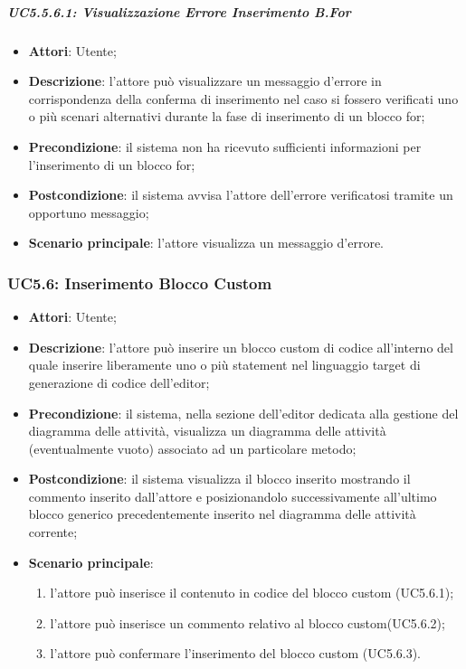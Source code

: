 \subparagraph{UC5.5.6.1: Visualizzazione Errore Inserimento B.For}
\label{UC5.5.6.1}
\begin{itemize}
\item \textbf{Attori}: Utente;
\item \textbf{Descrizione}: l'attore può visualizzare un messaggio d'errore in corrispondenza della conferma di inserimento nel caso si fossero verificati uno o più scenari alternativi durante la fase di inserimento di un blocco for;	
\item \textbf{Precondizione}: il sistema non ha ricevuto sufficienti informazioni per l'inserimento di un blocco for;	
\item \textbf{Postcondizione}: il sistema avvisa l'attore dell'errore verificatosi tramite un opportuno messaggio;	
\item \textbf{Scenario principale}:
l'attore visualizza un messaggio d'errore.	
\end{itemize}

\subsubsection{UC5.6: Inserimento Blocco Custom	}
\label{UC5.6}
\begin{itemize}
\item \textbf{Attori}: Utente;
\item \textbf{Descrizione}: l'attore può inserire un blocco custom di codice all'interno del quale inserire liberamente uno o più statement nel linguaggio target di generazione di codice dell'editor;	
\item \textbf{Precondizione}: il sistema, nella sezione dell'editor dedicata alla gestione del diagramma delle attività, visualizza un diagramma delle attività (eventualmente vuoto) associato ad un particolare metodo;	
\item \textbf{Postcondizione}: il sistema visualizza il blocco inserito mostrando il commento inserito dall'attore e posizionandolo successivamente all'ultimo blocco generico precedentemente 
inserito nel diagramma delle attività corrente;	
\item \textbf{Scenario principale}:
\begin{enumerate}
\item l'attore può inserisce il contenuto in codice del blocco custom (UC5.6.1);
\item l'attore può inserisce un commento relativo al blocco custom(UC5.6.2);
\item l'attore può confermare l'inserimento del blocco custom (UC5.6.3).	
\end{enumerate}
\end{itemize}

